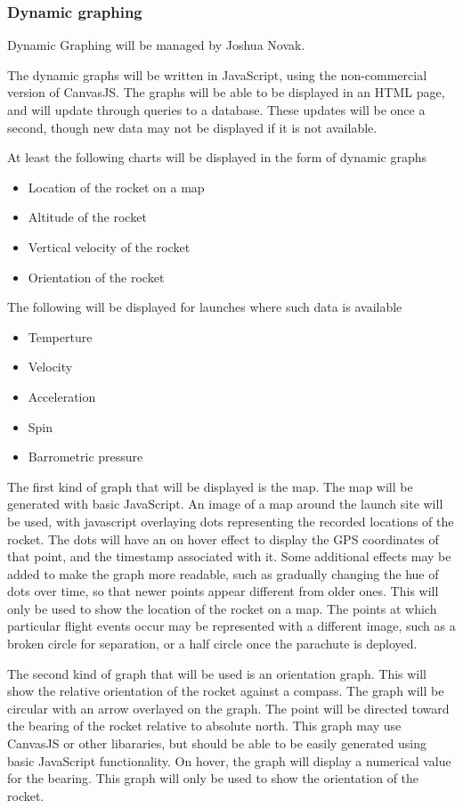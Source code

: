 \documentclass[onecolumn, draftclsnofoot, 10pt, compsoc]{IEEEtran}
\begin{document}
\subsubsection{Dynamic graphing}

Dynamic Graphing will be managed by Joshua Novak.

The dynamic graphs will be written in JavaScript, using the non-commercial version of CanvasJS. The graphs will be able to be displayed in an HTML page, and will update through queries to a database. These updates will be once a second, though new data may not be displayed if it is not available.

At least the following charts will be displayed in the form of dynamic graphs
\begin{itemize}
\item Location of the rocket on a map
\item Altitude of the rocket
\item Vertical velocity of the rocket
\item Orientation of the rocket
\end{itemize}

The following will be displayed for launches where such data is available
\begin{itemize}
\item Temperture
\item Velocity
\item Acceleration
\item Spin
\item Barrometric pressure
\end{itemize}

The first kind of graph that will be displayed is the map. The map will be generated with basic JavaScript. An image of a map around the launch site will be used, with javascript overlaying dots representing the recorded locations of the rocket. The dots will have an on hover effect to display the GPS coordinates of that point, and the timestamp associated with it. Some additional effects may be added to make the graph more readable, such as gradually changing the hue of dots over time, so that newer points appear different from older ones. This will only be used to show the location of the rocket on a map. The points at which particular flight events occur may be represented with a different image, such as a broken circle for separation, or a half circle once the parachute is deployed.

The second kind of graph that will be used is an orientation graph. This will show the relative orientation of the rocket against a compass. The graph will be circular with an arrow overlayed on the graph. The point will be directed toward the bearing of the rocket relative to absolute north. This graph may use CanvasJS or other libararies, but should be able to be easily generated using basic JavaScript functionality. On hover, the graph will display a numerical value for the bearing. This graph will only be used to show the orientation of the rocket.
\end{document}
